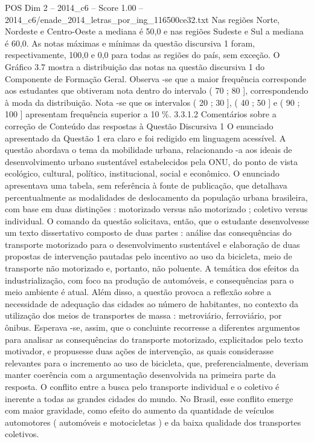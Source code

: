 \begin{textsample}{POS Dim 2 – 2014\_c6 – Score 1.00 – 2014\_c6/enade\_2014\_letras\_por\_ing\_116500ce32.txt}
Nas regiões Norte, Nordeste e Centro-Oeste a mediana é 50,0 e nas regiões Sudeste e Sul a mediana é 60,0.
As notas máximas e mínimas da questão discursiva 1 foram, respectivamente, 100,0 e 0,0 para todas as regiões do país, sem exceção.
O Gráfico 3.7 mostra a distribuição das notas na questão discursiva 1 do Componente de Formação Geral.
Observa -se que a maior frequência corresponde aos estudantes que obtiveram nota dentro do intervalo ( 70 ; 80 ], correspondendo à moda da distribuição.
Nota -se que os intervalos ( 20 ; 30 ], ( 40 ; 50 ] e ( 90 ; 100 ] apresentam frequência superior a 10 \%. 3.3.1.2 Comentários sobre a correção de Conteúdo das respostas à Questão Discursiva 1 O enunciado apresentado da Questão 1 era claro e foi redigido em linguagem acessível.
A questão abordava o tema da mobilidade urbana, relacionando -a aos ideais de desenvolvimento urbano sustentável estabelecidos pela ONU, do ponto de vista ecológico, cultural, político, institucional, social e econômico.
O enunciado apresentava uma tabela, sem referência à fonte de publicação, que detalhava percentualmente as modalidades de deslocamento da população urbana brasileira, com base em duas distinções : motorizado versus não motorizado ; coletivo versus individual.
O comando da questão solicitava, então, que o estudante desenvolvesse um texto dissertativo composto de duas partes : análise das consequências do transporte motorizado para o desenvolvimento sustentável e elaboração de duas propostas de intervenção pautadas pelo incentivo ao uso da bicicleta, meio de transporte não motorizado e, portanto, não poluente.
A temática dos efeitos da industrialização, com foco na produção de automóveis, e consequências para o meio ambiente é atual.
Além disso, a questão provoca a reflexão sobre a necessidade de adequação das cidades ao número de habitantes, no contexto da utilização dos meios de transportes de massa : metroviário, ferroviário, por ônibus.
Esperava -se, assim, que o concluinte recorresse a diferentes argumentos para analisar as consequências do transporte motorizado, explicitados pelo texto motivador, e propusesse duas ações de intervenção, as quais considerasse relevantes para o incremento ao uso de bicicleta, que, preferencialmente, deveriam manter coerência com a argumentação desenvolvida na primeira parte da resposta.
O conflito entre a busca pelo transporte individual e o coletivo é inerente a todas as grandes cidades do mundo.
No Brasil, esse conflito emerge com maior gravidade, como efeito do aumento da quantidade de veículos automotores ( automóveis e motocicletas ) e da baixa qualidade dos transportes coletivos.

\end{textsample}
